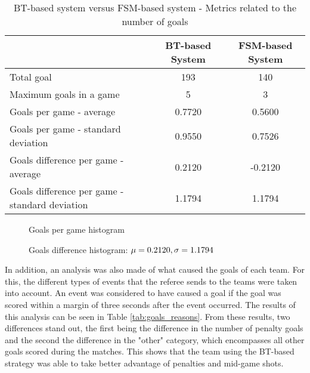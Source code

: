 \begin{table}[h]
    \centering
    \begin{tabular}{l c c}
        \toprule
                                                       & BT-based System & FSM-based System \\
        \midrule
        Total goal                                     & 193             & 140              \\
        Maximum goals in a game                        & 5               & 3                \\
        Goals per game - average                       & 0.7720          & 0.5600           \\
        Goals per game - standard deviation            & 0.9550          & 0.7526           \\
        Goals difference per game - average            & 0.2120          & -0.2120          \\
        Goals difference per game - standard deviation & 1.1794          & 1.1794           \\
        \bottomrule
    \end{tabular}
    \caption{BT-based system versus FSM-based system - Metrics related to the number of goals}
    \label{tab:goals_number_metrics}
\end{table}

\begin{figure}
    \begin{center}
        \scalebox{0.9} {
            
        }
    \end{center}
    \caption{Goals per game histogram}
    \label{fig:goals_diff_hist}
\end{figure}

\begin{figure}
    \begin{center}
        \scalebox{0.9} {
            
        }
    \end{center}
    \caption{Goals difference histogram: $\protect\mu = 0.2120, \sigma = 1.1794$}
    \label{fig:goals_per_game_hist}
\end{figure}

In addition, an analysis was also made of what caused the goals of each team. For this, the different types of events that the referee sends to the teams were taken into account. An event was considered to have caused a goal if the goal was scored within a margin of three seconds after the event occurred. The results of this analysis can be seen in Table \ref{tab:goals_reasons}. From these results, two differences stand out, the first being the difference in the number of penalty goals and the second the difference in the "other" category, which encompasses all other goals scored during the matches. This shows that the team using the BT-based strategy was able to take better advantage of penalties and mid-game shots.

